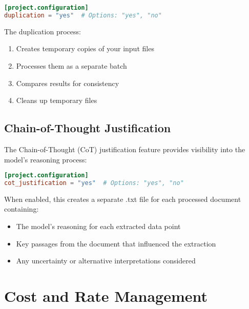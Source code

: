 \begin{configbox}
\begin{lstlisting}[language=TOML]
[project.configuration]
duplication = "yes"  # Options: "yes", "no"
\end{lstlisting}
\end{configbox}

The duplication process:
\begin{enumerate}
    \item Creates temporary copies of your input files
    \item Processes them as a separate batch
    \item Compares results for consistency
    \item Cleans up temporary files
\end{enumerate}

\subsection{Chain-of-Thought Justification}

The Chain-of-Thought (CoT) justification feature provides visibility into the model's reasoning process:

\begin{configbox}
\begin{lstlisting}[language=TOML]
[project.configuration]
cot_justification = "yes"  # Options: "yes", "no"
\end{lstlisting}
\end{configbox}

When enabled, this creates a separate .txt file for each processed document containing:
\begin{itemize}
    \item The model's reasoning for each extracted data point
    \item Key passages from the document that influenced the extraction
    \item Any uncertainty or alternative interpretations considered
\end{itemize}


\section{Cost and Rate Management}

